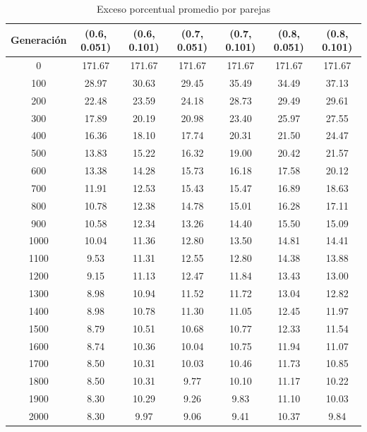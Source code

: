 \documentclass[12pt]{article}
\begin{document}
\begin{center}
  \begin{table}[!htbp]
  \caption{Exceso porcentual promedio por parejas}
  \begin{tabular}{| c | c | c | c | c | c | c |}
    \hline
      Generación & (0.6, 0.051)  & (0.6, 0.101)  & (0.7, 0.051)  & (0.7, 0.101)  & (0.8, 0.051)  & (0.8, 0.101)  \\ \hline
      0 & 171.67 & 171.67 & 171.67 & 171.67 & 171.67 & 171.67 \\ \hline
      100 & 28.97 & 30.63 & 29.45 & 35.49 & 34.49 & 37.13 \\ \hline
      200 & 22.48 & 23.59 & 24.18 & 28.73 & 29.49 & 29.61 \\ \hline
      300 & 17.89 & 20.19 & 20.98 & 23.40 & 25.97 & 27.55 \\ \hline
      400 & 16.36 & 18.10 & 17.74 & 20.31 & 21.50 & 24.47 \\ \hline
      500 & 13.83 & 15.22 & 16.32 & 19.00 & 20.42 & 21.57 \\ \hline
      600 & 13.38 & 14.28 & 15.73 & 16.18 & 17.58 & 20.12 \\ \hline
      700 & 11.91 & 12.53 & 15.43 & 15.47 & 16.89 & 18.63 \\ \hline
      800 & 10.78 & 12.38 & 14.78 & 15.01 & 16.28 & 17.11 \\ \hline
      900 & 10.58 & 12.34 & 13.26 & 14.40 & 15.50 & 15.09 \\ \hline
      1000 & 10.04 & 11.36 & 12.80 & 13.50 & 14.81 & 14.41 \\ \hline
      1100 & 9.53 & 11.31 & 12.55 & 12.80 & 14.38 & 13.88 \\ \hline
      1200 & 9.15 & 11.13 & 12.47 & 11.84 & 13.43 & 13.00 \\ \hline
      1300 & 8.98 & 10.94 & 11.52 & 11.72 & 13.04 & 12.82 \\ \hline
      1400 & 8.98 & 10.78 & 11.30 & 11.05 & 12.45 & 11.97 \\ \hline
      1500 & 8.79 & 10.51 & 10.68 & 10.77 & 12.33 & 11.54 \\ \hline
      1600 & 8.74 & 10.36 & 10.04 & 10.75 & 11.94 & 11.07 \\ \hline
      1700 & 8.50 & 10.31 & 10.03 & 10.46 & 11.73 & 10.85 \\ \hline
      1800 & 8.50 & 10.31 & 9.77 & 10.10 & 11.17 & 10.22 \\ \hline
      1900 & 8.30 & 10.29 & 9.26 & 9.83 & 11.10 & 10.03 \\ \hline
      2000 & 8.30 & 9.97 & 9.06 & 9.41 & 10.37 & 9.84 \\ \hline

    \end{tabular}
    \end{table}
\end{center}
\end{document}
